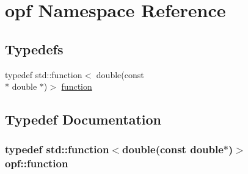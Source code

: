 \hypertarget{namespaceopf}{\section{opf Namespace Reference}
\label{namespaceopf}
}
\subsection*{Typedefs}
\begin{DoxyCompactItemize}
\item 
typedef std\+::function$<$ double(const \\*
double $\ast$)$>$ \hyperlink{namespaceopf_a3c63eb194cadb016d0d4168823516183}{function}
\end{DoxyCompactItemize}


\subsection{Typedef Documentation}
\hypertarget{namespaceopf_a3c63eb194cadb016d0d4168823516183}{
\subsubsection[{function}]{\setlength{\rightskip}{0pt plus 5cm}typedef std\+::function$<$double(const double$\ast$)$>$ {\bf opf\+::function}}}\label{namespaceopf_a3c63eb194cadb016d0d4168823516183}

